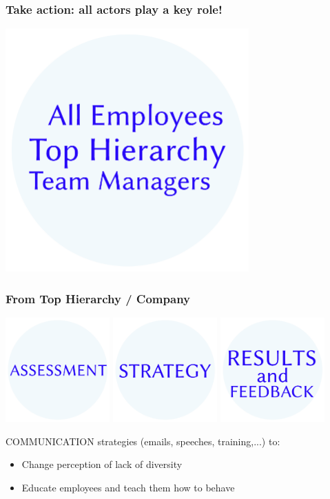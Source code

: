 \begin{frame}
\frametitle{Take action: all actors play a key role!}
\vskip 1.2cm
\begin{center}
\includegraphics[width=0.7\textwidth]{./pictures/Word-Cloud-actors.png}
\end{center}
\end{frame}
\begin{frame}
\frametitle{From Top Hierarchy / Company}
\vskip 0.7cm
\includegraphics[width=0.3\textwidth]{./pictures/Word-Cloud-assessment.png}\quad
\includegraphics[width=0.3\textwidth]{./pictures/Word-Cloud-strategy.png}\quad
\includegraphics[width=0.3\textwidth]{./pictures/Word-Cloud-results.png}

\vskip 0.6cm
\textcolor{isvblue}{COMMUNICATION strategies} (emails, speeches, training,...) to:
\vskip 0.2cm
\begin{itemize}
\item \textcolor{isvblue}{Change perception} of lack of diversity 
\item \textcolor{isvblue}{Educate employees} and teach them how to behave 
\end{itemize}
\end{frame}
